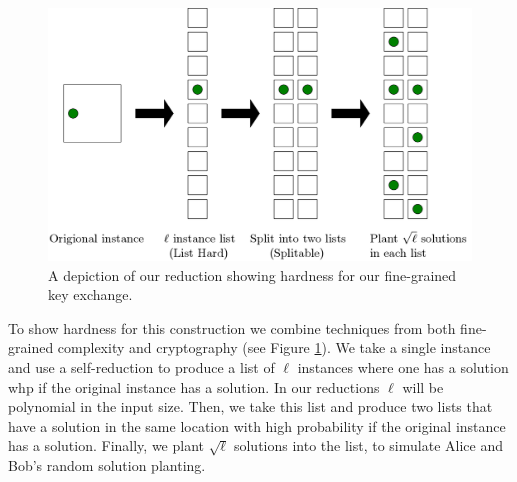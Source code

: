 \begin{figure}[h]
	\centering
	\includegraphics[scale=0.6]{FullReduction.png}
	\caption{A depiction of our reduction showing hardness for our fine-grained key exchange.}
	\label{fig:wholeReductionBoxes}
\end{figure}

To show hardness for this construction we combine techniques from both fine-grained complexity and cryptography (see Figure \ref{fig:wholeReductionBoxes}). We take a single instance and use a self-reduction to produce a list of $\ell$ instances where one has a solution whp if the original instance has a solution. In our reductions $\ell$ will be polynomial in the input size. Then, we take this list and produce two lists that have a solution in the same location with high probability if the original instance has a solution. Finally, we plant $\sqrt{\ell}$ solutions into the list, to simulate Alice and Bob's random solution planting. 







